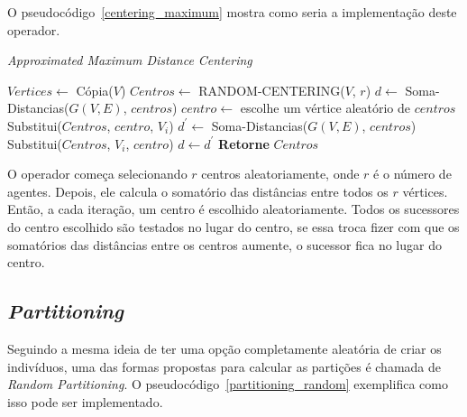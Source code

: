 O pseudocódigo~\ref{centering_maximum} mostra como seria a implementação deste 
operador.

\begin{algorithm}                  %
	\caption{\textit{Approximated Maximum Distance Centering}}          %
	\label{centering_maximum}                           %
	\begin{algorithmic}                    %
		\newline
		\State $Vertices \gets $ Cópia($V$)
		\State $Centros \gets $ RANDOM-CENTERING($V$, $r$)
		\State $d \gets $ Soma-Distancias($G(V,E)$, $centros$) 
		\Repeat
			\State $centro \gets $ escolhe um vértice aleatório de $centros$
				\State Substitui($Centros$, $centro$, $V_{i}$) 
				\State $d^{\prime} \gets $ Soma-Distancias($G(V,E)$, $centros$)
					\State Substitui($Centros$, $V_{i}$, $centro$)
				\Else 
					\State $d \gets d^{\prime}$
				\EndIf
			\EndFor
		\State \textbf{Retorne} $Centros$
		\EndProcedure
	\end{algorithmic}
\end{algorithm}

O operador começa selecionando $r$ centros aleatoriamente, onde $r$ é o número 
de agentes. Depois, ele calcula o somatório das distâncias entre todos os $r$ 
vértices. Então, a cada iteração, um centro é escolhido aleatoriamente. Todos 
os sucessores do centro escolhido são testados no lugar do centro, se essa troca 
fizer com que os somatórios das distâncias entre os centros aumente, o sucessor 
fica no lugar do centro.

\subsection{\textit{Partitioning}}

Seguindo a mesma ideia de ter uma opção completamente aleatória de criar os 
indivíduos, uma das formas propostas para calcular as partições é chamada de 
\textit{Random Partitioning}. O pseudocódigo~\ref{partitioning_random} 
exemplifica como isso pode ser implementado.

